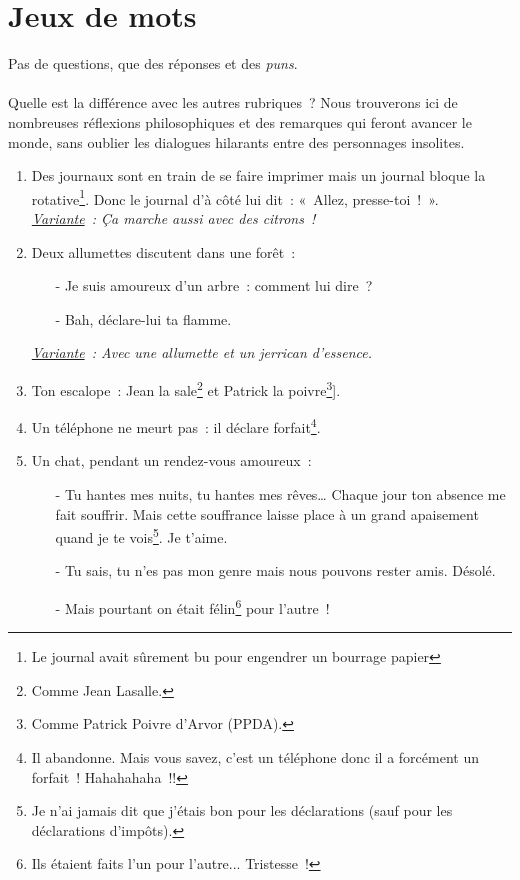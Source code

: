 \documentclass[10pt,a5paper,fullpage]{book}
\begin{document}
	\chapter{Jeux de mots}
	Pas de questions, que des réponses et des \textit{puns}. \\ \\
	Quelle est la différence avec les autres rubriques~? Nous trouverons ici de nombreuses réflexions philosophiques et des remarques qui feront avancer le monde, sans oublier les dialogues hilarants entre des personnages insolites. 
	\newpage
	\begin{enumerate}
		\item Des journaux sont en train de se faire imprimer mais un journal bloque la rotative\footnote{Le journal avait sûrement bu pour engendrer un bourrage papier}. Donc le journal d'à côté lui dit~: «~Allez, presse-toi~!~».
		\\ \textit{\underline{Variante}~: Ça marche aussi avec des citrons~!}
		\item Deux allumettes discutent dans une forêt~:
		\begin{itemize}
			\item[-] Je suis amoureux d’un arbre~: comment lui dire~?
			\item[-] Bah, déclare-lui ta flamme. 
		\end{itemize}
		\textit{\underline{Variante}~: Avec une allumette et un jerrican d’essence.}
		\item Ton escalope~: Jean la sale\footnote{Comme Jean Lasalle.} et Patrick la poivre\footnote{Comme Patrick Poivre d'Arvor (PPDA).}].
		\item Un téléphone ne meurt pas~: il déclare forfait\footnote{Il abandonne. Mais vous savez, c’est un téléphone donc il a forcément un forfait~! Hahahahaha~!!}.			
		\item Un chat, pendant un rendez-vous amoureux~:
		\begin{itemize}
			\item[-] Tu hantes mes nuits, tu hantes mes rêves… Chaque jour ton absence me fait souffrir. Mais cette souffrance laisse place à un grand apaisement quand je te vois\footnote{Je n'ai jamais dit que j'étais bon pour les déclarations (sauf pour les déclarations d'impôts).}. Je t’aime.
			\item[-] Tu sais, tu n’es pas mon genre mais nous pouvons rester amis. Désolé.
			\item[-] Mais pourtant on était félin\footnote{Ils étaient faits l'un pour l'autre... Tristesse~!} pour l’autre~!

\end{itemize}
\end{enumerate}
\end{document}
